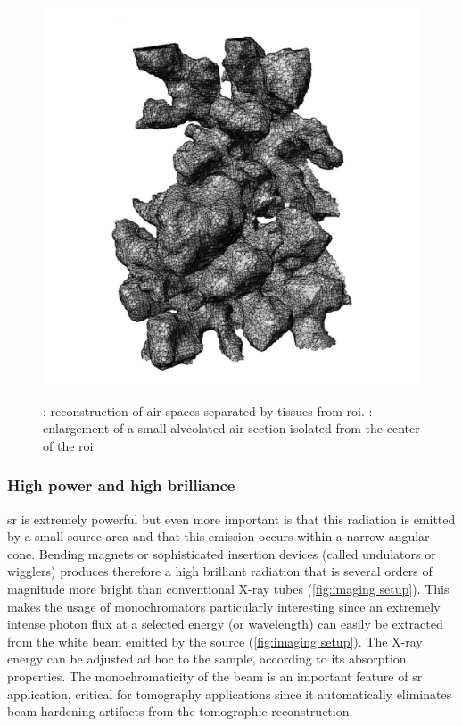 \begin{figure}[htb]
{{			\includegraphics[width=\imsize]{img/Tsuda2008/Tsuda-09b}%
			\label{subfig:tsuda-09b}%
		}%
	}%
	\caption[\threed reconstruction of air spaces]{: reconstruction of \threed air spaces separated by tissues from \ac{roi}. : enlargement of a small alveolated air section isolated from the center of the \ac{roi}.}
	\label{fig:tsuda-09}
\end{figure}%

\subsubsection{High power and high brilliance}
\ac{sr} is extremely powerful but even more important is that this radiation is emitted by a small source area and that this emission occurs within a narrow angular cone. Bending magnets or sophisticated insertion devices (called undulators or wigglers) produces therefore a high brilliant radiation that is several orders of magnitude more bright than conventional X-ray tubes (\autoref{fig:imaging setup}). This makes the usage of monochromators particularly interesting since an extremely intense photon flux at a selected energy (or wavelength) can easily be extracted from the white beam emitted by the source (\autoref{fig:imaging setup}). The X-ray energy can be adjusted ad hoc to the sample, according to its absorption properties. The monochromaticity of the beam is an important feature of \ac{sr} application, critical for tomography applications since it automatically eliminates beam hardening artifacts from the tomographic reconstruction.

